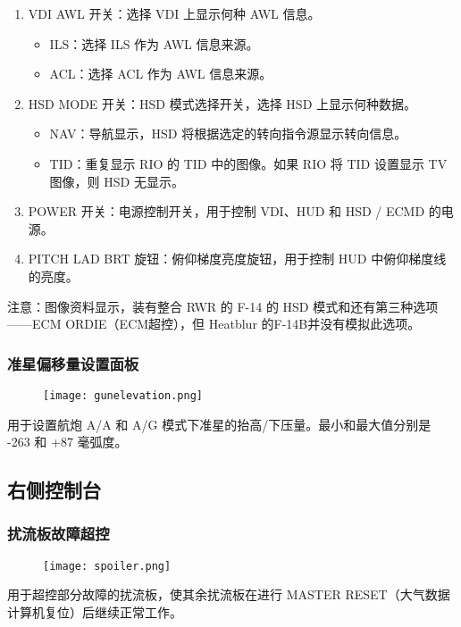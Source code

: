 \begin{enumerate}
\begin{itemize}
	      \end{itemize}
	\item VDI AWL 开关：选择 VDI 上显示何种 AWL 信息。
	      \begin{itemize}
		      \item ILS：选择 ILS 作为 AWL 信息来源。
		      \item ACL：选择 ACL 作为 AWL 信息来源。
	      \end{itemize}
	\item HSD MODE 开关：HSD 模式选择开关，选择 HSD 上显示何种数据。
	      \begin{itemize}
		      \item NAV：导航显示，HSD 将根据选定的转向指令源显示转向信息。
		      \item TID：重复显示 RIO 的 TID 中的图像。如果 RIO 将 TID 设置显示 TV 图像，则 HSD 无显示。
	      \end{itemize}
	\item POWER 开关：电源控制开关，用于控制 VDI、HUD 和 HSD / ECMD 的电源。
	\item PITCH LAD BRT 旋钮：俯仰梯度亮度旋钮，用于控制 HUD 中俯仰梯度线的亮度。
\end{enumerate}
注意：图像资料显示，装有整合 RWR 的 F-14 的 HSD 模式和还有第三种选项——ECM ORDIE（ECM超控），但 Heatblur 的F-14B并没有模拟此选项。

\subsubsection{准星偏移量设置面板}

\begin{figure}[htb]
	\centering
	\texttt{[image: gunelevation.png]}
\end{figure}
用于设置航炮 A/A 和 A/G 模式下准星的抬高/下压量。最小和最大值分别是 -263 和 +87 毫弧度。

\subsection{右侧控制台}

\subsubsection{扰流板故障超控}

\begin{figure}[htb]
	\centering
	\texttt{[image: spoiler.png]}
\end{figure}
用于超控部分故障的扰流板，使其余扰流板在进行 MASTER RESET（大气数据计算机复位）后继续正常工作。

